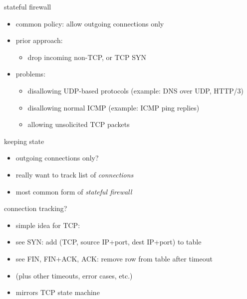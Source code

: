 \begin{frame}{stateful firewall}
    \begin{itemize}
    \item common policy: allow outgoing connections only
    \vspace{.5cm}
    \item prior approach:
        \begin{itemize}
        \item drop incoming non-TCP, or TCP SYN
        \end{itemize}
    \item problems:
        \begin{itemize}
        \item disallowing UDP-based protocols (example: DNS over UDP, HTTP/3)
        \item disallowing normal ICMP (example: ICMP ping replies)
        \item allowing unsolicited TCP packets
        \end{itemize}
    \end{itemize}
\end{frame}

\begin{frame}{keeping state}
    \begin{itemize}
    \item outgoing connections only?
    \item really want to track list of \textit{connections}
    \vspace{.5cm}
    \item most common form of \textit{stateful firewall}
    \end{itemize}
\end{frame}

\begin{frame}{connection tracking?}
    \begin{itemize}
    \item simple idea for TCP:
    \item see SYN: add (TCP, source IP+port, dest IP+port) to table
    \item see FIN, FIN+ACK, ACK: remove row from table after timeout
    \item (plus other timeouts, error cases, etc.)
    \vspace{.5cm}
    \item mirrors TCP state machine
    \end{itemize}
\end{frame}

